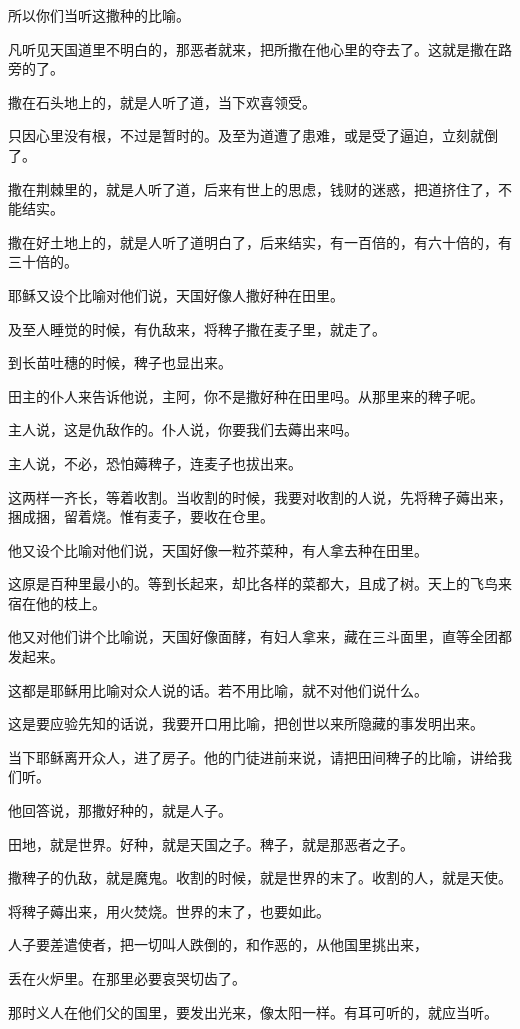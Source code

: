 \documentclass[12pt,oneside]{book}
\begin{document}
所以你们当听这撒种的比喻。

凡听见天国道里不明白的，那恶者就来，把所撒在他心里的夺去了。这就是撒在路旁的了。

撒在石头地上的，就是人听了道，当下欢喜领受。

只因心里没有根，不过是暂时的。及至为道遭了患难，或是受了逼迫，立刻就倒了。

撒在荆棘里的，就是人听了道，后来有世上的思虑，钱财的迷惑，把道挤住了，不能结实。

撒在好土地上的，就是人听了道明白了，后来结实，有一百倍的，有六十倍的，有三十倍的。

耶稣又设个比喻对他们说，天国好像人撒好种在田里。

及至人睡觉的时候，有仇敌来，将稗子撒在麦子里，就走了。

到长苗吐穗的时候，稗子也显出来。

田主的仆人来告诉他说，主阿，你不是撒好种在田里吗。从那里来的稗子呢。

主人说，这是仇敌作的。仆人说，你要我们去薅出来吗。

主人说，不必，恐怕薅稗子，连麦子也拔出来。

这两样一齐长，等着收割。当收割的时候，我要对收割的人说，先将稗子薅出来，捆成捆，留着烧。惟有麦子，要收在仓里。

他又设个比喻对他们说，天国好像一粒芥菜种，有人拿去种在田里。

这原是百种里最小的。等到长起来，却比各样的菜都大，且成了树。天上的飞鸟来宿在他的枝上。

他又对他们讲个比喻说，天国好像面酵，有妇人拿来，藏在三斗面里，直等全团都发起来。

这都是耶稣用比喻对众人说的话。若不用比喻，就不对他们说什么。

这是要应验先知的话说，我要开口用比喻，把创世以来所隐藏的事发明出来。

当下耶稣离开众人，进了房子。他的门徒进前来说，请把田间稗子的比喻，讲给我们听。

他回答说，那撒好种的，就是人子。

田地，就是世界。好种，就是天国之子。稗子，就是那恶者之子。

撒稗子的仇敌，就是魔鬼。收割的时候，就是世界的末了。收割的人，就是天使。

将稗子薅出来，用火焚烧。世界的末了，也要如此。

人子要差遣使者，把一切叫人跌倒的，和作恶的，从他国里挑出来，

丢在火炉里。在那里必要哀哭切齿了。

那时义人在他们父的国里，要发出光来，像太阳一样。有耳可听的，就应当听。
\end{document}
